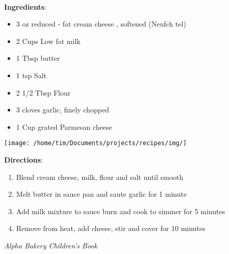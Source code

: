 \documentclass[11pt, twoside, openany]{book}
\begin{document}
 \label{guiltless-alfredo-sauce}\hfill\textit{}\\
\begin{minipage}[t]{0.8\linewidth}
\textbf{Ingredients}:\vspace{-3mm}
\begin{multicols}{2}
\begin{itemize}\setlength\itemsep{-1mm}
\item 3 oz reduced - fat cream cheese , softened (Neufch tel)
\item 2 Cups Low fat milk
\item 1 Tbsp butter
\item 1 tsp Salt
\item 2 1/2 Tbsp Flour
\item 3 cloves garlic, finely chopped
\item 1 Cup grated Parmesan cheese
\end{itemize}
\end{multicols}
\end{minipage}
\begin{minipage}[t]{0.2\linewidth}
\centering \strut\vspace*{-\baselineskip}\newline
\texttt{[image: /home/tim/Documents/projects/recipes/img/]}\\
\end{minipage}\vspace{3mm}
\textbf{Directions}:
\vspace{-3mm}\begin{enumerate}\setlength\itemsep{-1mm}
\item Blend cream cheese, milk, flour and salt until smooth
\item Melt butter in sauce pan and saute garlic for 1 minute
\item Add milk mixture to sauce burn and cook to simmer for 5 minutes
\item Remove from heat, add cheese, stir and cover for 10 minutes
\end{enumerate}
 \label{banana-bread}\hfill\textit{Alpha Bakery Children's Book}\\
\end{document}
